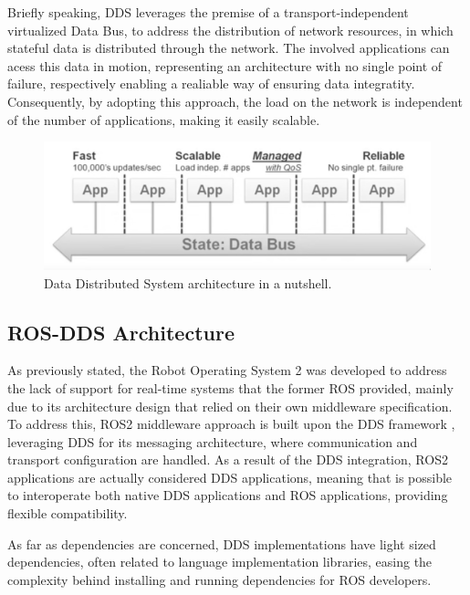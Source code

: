 Briefly speaking, DDS leverages the premise of a transport-independent virtualized Data Bus, to address the distribution of network resources, in which stateful data is distributed through the network. The involved applications can acess this data in motion, representing an architecture with no single point of failure, respectively enabling a realiable way of ensuring data integratity. Consequently, by adopting this approach, the load on the network is independent of the number of applications, making it easily scalable. 


\begin{figure}[H]
    \centering
    \includegraphics[width=0.6\linewidth]{images/dds-architecture.png}
    \caption{Data Distributed System architecture in a nutshell.}
    \label{fig:dds-architecture-nutshell}
\end{figure}


\subsection{ROS-DDS Architecture}

As previously stated, the Robot Operating System 2 was developed to address the lack of support for real-time systems that the former ROS provided, mainly due to its architecture design that relied on their own middleware specification. To address this, ROS2 middleware approach is built upon the DDS framework \cite{maruyama2016exploring}, leveraging DDS for its messaging architecture, where communication and transport configuration are handled. As a result of the DDS integration, ROS2 applications are actually considered DDS applications, meaning that is possible to interoperate both native DDS applications and ROS applications, providing flexible compatibility.

As far as dependencies are concerned, DDS implementations have light sized dependencies, often related to language implementation libraries, easing the complexity behind installing and running dependencies for ROS developers. \cite{ros-on-dds}

